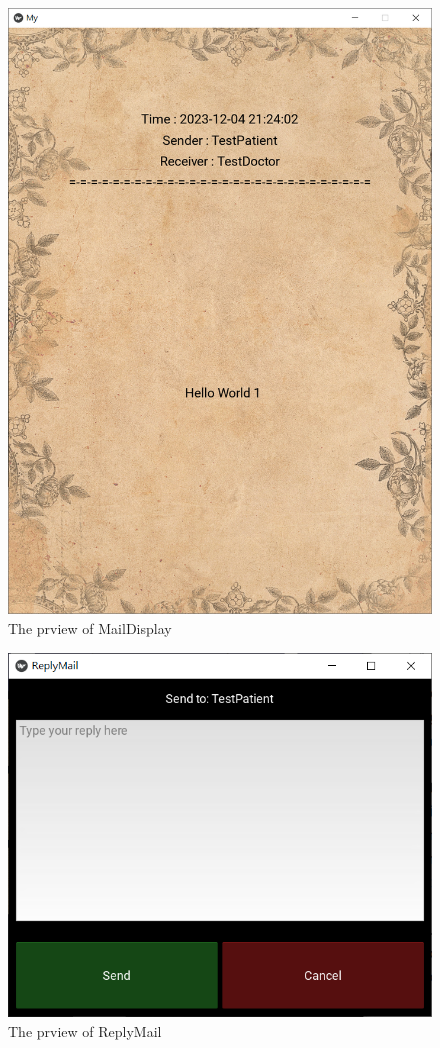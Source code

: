 \documentclass{article}
\begin{document}
\begin{figure}[h]
  \centering
  \includegraphics[scale = 0.5]{asset/doctor_gui/frontend_chat_show.png}
  \caption{The prview of MailDisplay}
  \label{fig:frontend_chat_show}
\end{figure}
\begin{figure}[h]
  \centering
  \includegraphics[scale = 0.5]{asset/doctor_gui/frontend_chat_reply.png}
  \caption{The prview of ReplyMail}
  \label{fig:frontend_chat_reply}
\end{figure}
\end{document}
